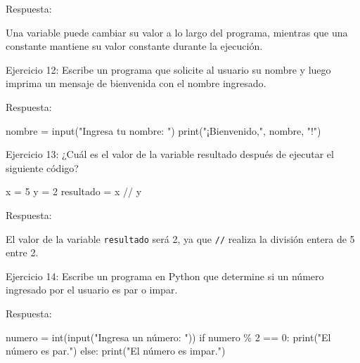 \documentclass[
  a4paper,
  onepage,
  openany]{scrreprt}
\newenvironment{Shaded}{\begin{snugshade}}{\end{snugshade}}
\newcommand{\BuiltInTok}[1]{\textcolor[rgb]{0.00,0.23,0.31}{#1}}
\newcommand{\ControlFlowTok}[1]{\textcolor[rgb]{0.00,0.23,0.31}{#1}}
\newcommand{\DecValTok}[1]{\textcolor[rgb]{0.68,0.00,0.00}{#1}}
\newcommand{\NormalTok}[1]{\textcolor[rgb]{0.00,0.23,0.31}{#1}}
\newcommand{\OperatorTok}[1]{\textcolor[rgb]{0.37,0.37,0.37}{#1}}
\newcommand{\StringTok}[1]{\textcolor[rgb]{0.13,0.47,0.30}{#1}}
\begin{document}
Respuesta:

Una variable puede cambiar su valor a lo largo del programa, mientras
que una constante mantiene su valor constante durante la ejecución.

Ejercicio 12: Escribe un programa que solicite al usuario su nombre y
luego imprima un mensaje de bienvenida con el nombre ingresado.

Respuesta:

\begin{Shaded}
\begin{Highlighting}[]
\NormalTok{nombre }\OperatorTok{=} \BuiltInTok{input}\NormalTok{(}\StringTok{"Ingresa tu nombre: "}\NormalTok{)}
\BuiltInTok{print}\NormalTok{(}\StringTok{"¡Bienvenido,"}\NormalTok{, nombre, }\StringTok{"!"}\NormalTok{)}
\end{Highlighting}
\end{Shaded}

Ejercicio 13: ¿Cuál es el valor de la variable resultado después de
ejecutar el siguiente código?

\begin{Shaded}
\begin{Highlighting}[]
\NormalTok{x }\OperatorTok{=} \DecValTok{5}
\NormalTok{y }\OperatorTok{=} \DecValTok{2}
\NormalTok{resultado }\OperatorTok{=}\NormalTok{ x }\OperatorTok{//}\NormalTok{ y}
\end{Highlighting}
\end{Shaded}

Respuesta:

El valor de la variable \texttt{resultado} será 2, ya que \texttt{//}
realiza la división entera de 5 entre 2.

Ejercicio 14: Escribe un programa en Python que determine si un número
ingresado por el usuario es par o impar.

Respuesta:

\begin{Shaded}
\begin{Highlighting}[]
\NormalTok{numero }\OperatorTok{=} \BuiltInTok{int}\NormalTok{(}\BuiltInTok{input}\NormalTok{(}\StringTok{"Ingresa un número: "}\NormalTok{))}
\ControlFlowTok{if}\NormalTok{ numero }\OperatorTok{\%} \DecValTok{2} \OperatorTok{==} \DecValTok{0}\NormalTok{:}
    \BuiltInTok{print}\NormalTok{(}\StringTok{"El número es par."}\NormalTok{)}
\ControlFlowTok{else}\NormalTok{:}
    \BuiltInTok{print}\NormalTok{(}\StringTok{"El número es impar."}\NormalTok{)}
\end{Highlighting}
\end{Shaded}
\end{document}
